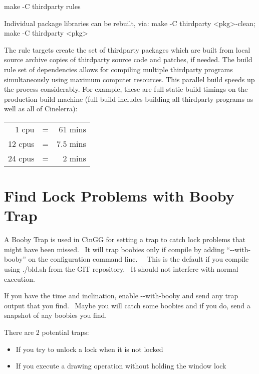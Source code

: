 \hspace{2em}make -C thirdparty rules
\medskip

Individual package libraries can be rebuilt, via:
\smallskip
\hspace{2em}make -C thirdparty <pkg>-clean;  make -C thirdparty <pkg>
\medskip

The rule targets create the set of thirdparty packages which are built from local source archive copies of thirdparty source code and patches, if needed.  The build rule set of dependencies allows for compiling multiple thirdparty programs simultaneously using maximum computer resources.  This parallel build speeds up the process considerably.  For example, these are full static build timings on the production build machine (full build includes building all thirdparty programs as well as all of Cinelerra):
\medskip

\hspace{2em}
\begin{tabular}{@{}rcr}
	1 cpu & = & 61 mins\\
	12 cpus & = & 7.5 mins\\
	24 cpus & = & 2 mins\\
\end{tabular}

\section{Find Lock Problems with Booby Trap}
\label{sec:Find Lock Problems with Booby Trap}

A Booby Trap is used in CinGG for setting a trap to catch lock problems that might have been missed. \ It will trap boobies only if compile by adding ``-{}-with-booby'' on the configuration command line. \ \ This is the default if you compile using ./bld.sh from the GIT repository. \ It should not interfere with normal execution.
\medskip

If you have the time and inclination, enable -{}-with-booby and send any trap output that you find. \ Maybe you will catch some boobies and if you do, send a snapshot of any boobies you find.
\medskip

There are 2 potential traps:
\begin{itemize}[nosep]
	\item If you try to unlock a lock when it is not locked
	\item If you execute a drawing operation without holding the window lock
\end{itemize}
\medskip

